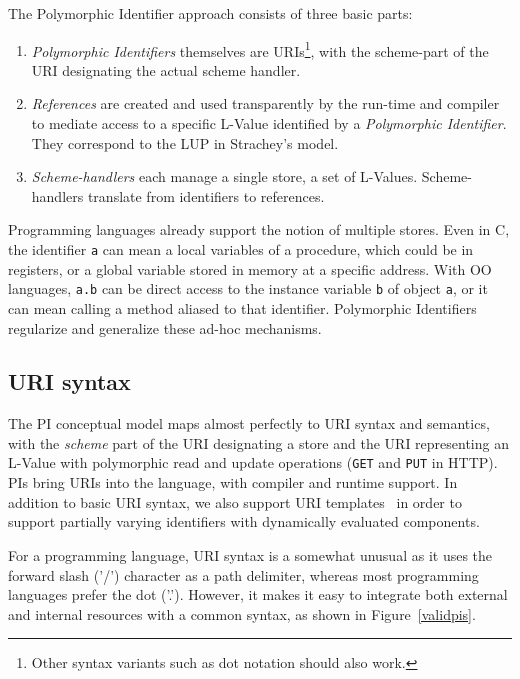 \documentclass[preprint]{sigplanconf}
\begin{document}
The Polymorphic Identifier approach consists of three basic parts:
\begin{enumerate}
\item \emph{Polymorphic Identifiers} themselves are URIs\footnote{Other syntax variants such as dot notation should also work.}, with the scheme-part of the URI designating the actual scheme handler.
	
\item \emph{References} are created and used transparently by the run-time and compiler
	to mediate access to a specific L-Value identified by a \emph{Polymorphic Identifier}.
	They correspond to the LUP in Strachey's model.  

\item \emph{Scheme-handlers} each manage a single store, a set of L-Values.  Scheme-handlers 
	translate from identifiers to references.
	
	
\end{enumerate}

Programming languages already support the notion of multiple stores.  Even in C, the identifier {\tt a}
can mean a local variables of a procedure, which could be in registers, or a global
variable stored in memory at a specific address.  With OO languages, {\tt a.b} can be direct
access to the instance variable {\tt b} of object {\tt a}, or it can mean calling a method aliased
to that identifier.  Polymorphic Identifiers regularize and generalize these ad-hoc mechanisms.

\subsection{URI syntax}

The PI conceptual model maps almost perfectly to URI syntax and semantics, with the \emph{scheme}
part of the URI designating a store and the URI representing an L-Value with polymorphic read
and update operations ({\tt GET} and {\tt PUT} in HTTP).  PIs bring URIs into the language, with
compiler and runtime support.  In addition to basic URI syntax, we also support URI templates~\cite{rfc6570}
in order to support partially varying identifiers with dynamically evaluated components.

For a programming language, URI syntax is a somewhat unusual as it uses the forward slash ('/')
character as a path delimiter, whereas most programming languages prefer the dot ('.').  However,
it makes it easy to integrate both external and internal resources with a common syntax, as shown 
in Figure~\ref{validpis}.
\end{document}
